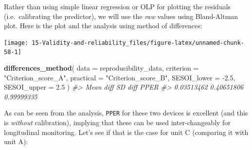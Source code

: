 \documentclass[
]{book}
\newenvironment{Shaded}{\begin{snugshade}}{\end{snugshade}}
\newcommand{\CommentTok}[1]{\textcolor[rgb]{0.56,0.35,0.01}{\textit{#1}}}
\newcommand{\DataTypeTok}[1]{\textcolor[rgb]{0.13,0.29,0.53}{#1}}
\newcommand{\FloatTok}[1]{\textcolor[rgb]{0.00,0.00,0.81}{#1}}
\newcommand{\KeywordTok}[1]{\textcolor[rgb]{0.13,0.29,0.53}{\textbf{#1}}}
\newcommand{\NormalTok}[1]{#1}
\newcommand{\OperatorTok}[1]{\textcolor[rgb]{0.81,0.36,0.00}{\textbf{#1}}}
\newcommand{\StringTok}[1]{\textcolor[rgb]{0.31,0.60,0.02}{#1}}
\begin{document}
Rather than using simple linear regression or OLP for plotting the residuals (i.e.~calibrating the predictor), we will use the \emph{raw} values using Bland-Altman plot. Here is the plot and the analysis using method of differences:

\begin{Shaded}
\end{Shaded}

\begin{center}\texttt{[image: 15-Validity-and-reliability\_files/figure-latex/unnamed-chunk-58-1]} \end{center}

\begin{Shaded}
\begin{Highlighting}[]
\KeywordTok{differences\_method}\NormalTok{(}
  \DataTypeTok{data =}\NormalTok{ reproducibility\_data,}
  \DataTypeTok{criterion =} \StringTok{"Criterion\_score\_A"}\NormalTok{,}
  \DataTypeTok{practical =} \StringTok{"Criterion\_score\_B"}\NormalTok{,}
  \DataTypeTok{SESOI\_lower =} \FloatTok{{-}2.5}\NormalTok{,}
  \DataTypeTok{SESOI\_upper =} \FloatTok{2.5}
\NormalTok{)}
\CommentTok{\#>  Mean diff    SD diff       PPER }
\CommentTok{\#> 0.03513462 0.40651806 0.99999335}
\end{Highlighting}
\end{Shaded}

As can be seen from the analysis, \texttt{PPER} for these two devices is excellent (and this is \emph{without} calibration), implying that these can be used inter-changeably for longitudinal monitoring. Let's see if that is the case for unit C (comparing it with unit A):

\begin{Shaded}
\end{Shaded}
\end{document}
